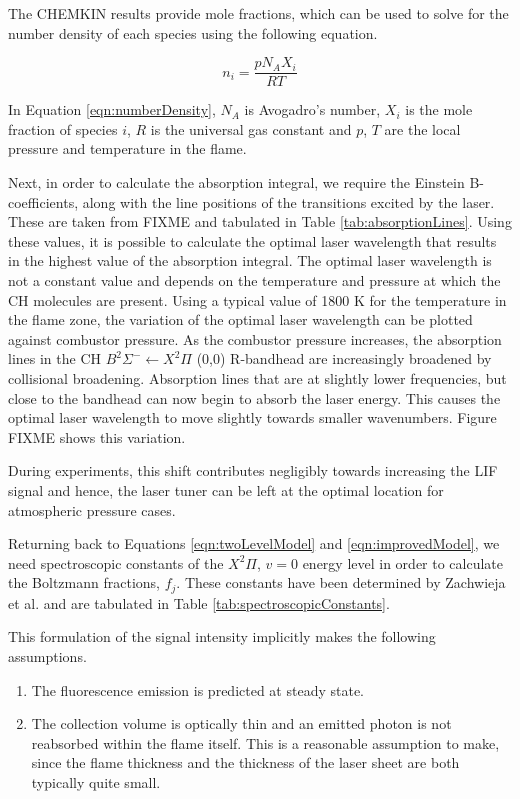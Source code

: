 The CHEMKIN results provide mole fractions, which can be used to solve for the number density of each species using the following equation.

\begin{equation}
  n_i = \frac{pN_AX_i}{RT}
  \label{eqn:numberDensity}
\end{equation}

In Equation \ref{eqn:numberDensity}, \(N_A\) is Avogadro's number, \(X_i\) is the mole fraction of species \(i\), \(R\) is the universal gas constant and \(p\), \(T\) are the local pressure and temperature in the flame.

Next, in order to calculate the absorption integral, we require the Einstein B-coefficients, along with the line positions of the transitions excited by the laser.
These are taken from FIXME and tabulated in Table \ref{tab:absorptionLines}.
Using these values, it is possible to calculate the optimal laser wavelength that results in the highest value of the absorption integral.
The optimal laser wavelength is not a constant value and depends on the temperature and pressure at which the CH molecules are present.
Using a typical value of 1800 K for the temperature in the flame zone, the variation of the optimal laser wavelength can be plotted against combustor pressure.
As the combustor pressure increases, the absorption lines in the CH \(B^2\Sigma^-\leftarrow X^2\Pi\) (0,0) R-bandhead are increasingly broadened by collisional broadening.
Absorption lines that are at slightly lower frequencies, but close to the bandhead can now begin to absorb the laser energy.
This causes the optimal laser wavelength to move slightly towards smaller wavenumbers.
Figure FIXME shows this variation.

During experiments, this shift contributes negligibly towards increasing the LIF signal and hence, the laser tuner can be left at the optimal location for atmospheric pressure cases.



Returning back to Equations \ref{eqn:twoLevelModel} and \ref{eqn:improvedModel}, we need spectroscopic constants of the \(X^2\Pi\), \(v=0\) energy level in order to calculate the Boltzmann fractions, \(f_j\).
These constants have been determined by Zachwieja et al.\cite{1995-zachwieja} and are tabulated in Table \ref{tab:spectroscopicConstants}.


This formulation of the signal intensity implicitly makes the following assumptions.
\begin{enumerate}
\item The fluorescence emission is predicted at steady state.
\item The collection volume is optically thin and an emitted photon is not reabsorbed within the flame itself.
This is a reasonable assumption to make, since the flame thickness and the thickness of the laser sheet are both typically quite small.
\end{enumerate}

